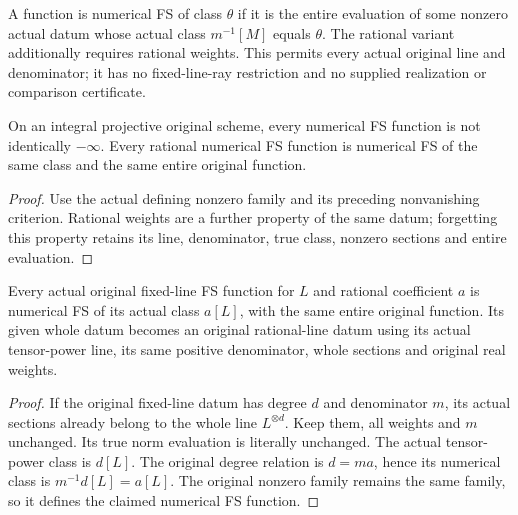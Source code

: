 \begin{definition}
\label{def:native-numerical-whole-section-fs}
\leanok
{}
A function is numerical FS of class $\theta$ if it is the entire evaluation
of some nonzero actual datum whose actual class $m^{-1}[M]$ equals $\theta$.
The rational variant additionally requires rational weights. This permits
every actual original line and denominator; it has no fixed-line-ray
restriction and no supplied realization or comparison certificate.
\end{definition}

\begin{theorem}
\label{thm:native-numerical-fs-generically-finite}
\leanok
{}
On an integral projective original scheme, every numerical FS function is
not identically $-\infty$. Every rational numerical FS function is numerical
FS of the same class and the same entire original function.
\end{theorem}
\begin{proof}
Use the actual defining nonzero family and its preceding nonvanishing
criterion. Rational weights are a further property of the same datum;
forgetting this property retains its line, denominator, true class,
nonzero sections and entire evaluation.
\end{proof}

\begin{theorem}
\label{thm:native-numerical-fs-from-ray}
\leanok
{}
Every actual original fixed-line FS function for $L$ and rational
coefficient $a$ is numerical FS of its actual class $a[L]$, with the same
entire original function. Its given whole datum becomes an original
rational-line datum using its actual tensor-power line, its same positive
denominator, whole sections and original real weights.
\end{theorem}
\begin{proof}
If the original fixed-line datum has degree $d$ and denominator $m$, its
actual sections already belong to the whole line $L^{\otimes d}$.
Keep them, all weights and $m$ unchanged. Its true norm evaluation is
literally unchanged. The actual tensor-power class is $d[L]$. The original
degree relation is $d=ma$, hence its numerical class is
$m^{-1}d[L]=a[L]$. The original nonzero family remains the same family,
so it defines the claimed numerical FS function.
\end{proof}

